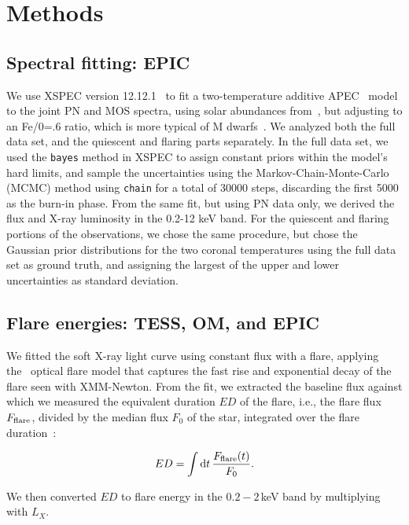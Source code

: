 \documentclass[twocolumn]{aastex631}
\begin{document}
\section{Methods}
\label{sec:methods}


\subsection{Spectral fitting: EPIC}
We use XSPEC version 12.12.1~\citep{arnaud1996xspec} to fit a two-temperature additive APEC~\citep{smith2001collisional,foster2012updated} model to the joint PN and MOS spectra, using solar abundances from~\citet{grevesse1998standard}, but adjusting to an Fe/0=.6 ratio, which is more typical of M dwarfs~\citep{wood2018chandra}. We analyzed both the full data set, and the quiescent and flaring parts separately. In the full data set, we used the \texttt{bayes} method in XSPEC to assign constant priors within the model's hard limits, and sample the uncertainties using the Markov-Chain-Monte-Carlo (MCMC) method using \texttt{chain} for a total of 30000 steps, discarding the first 5000 as the burn-in phase. From the same fit, but using PN data only, we derived the flux and X-ray luminosity in the 0.2-12 keV band. For the quiescent and flaring portions of the observations, we chose the same procedure, but chose the Gaussian prior distributions for the two coronal temperatures using the full data set as ground truth, and assigning the largest of the upper and lower uncertainties as standard deviation.

\subsection{Flare energies: TESS, OM, and EPIC}

We fitted the soft X-ray light curve using constant flux with a flare, applying the~\citet{davenport2014kepler} optical flare model that captures the fast rise and exponential decay of the flare seen with XMM-Newton. From the fit, we extracted the baseline flux against which we measured the equivalent duration $ED$ of the flare, i.e., the flare flux $F_{\rm flare}$, divided by the median flux $F_0$ of the star, integrated over the flare duration~\citep{gershberg1972results}:

\begin{equation}
\label{eq:ED}
ED=\displaystyle \int \mathrm dt\, \frac{F_{\rm flare}(t)}{F_0}.
\end{equation}

We then converted $ED$ to flare energy in the $0.2-2\,$keV band by multiplying with $L_X$. 
\end{document}
